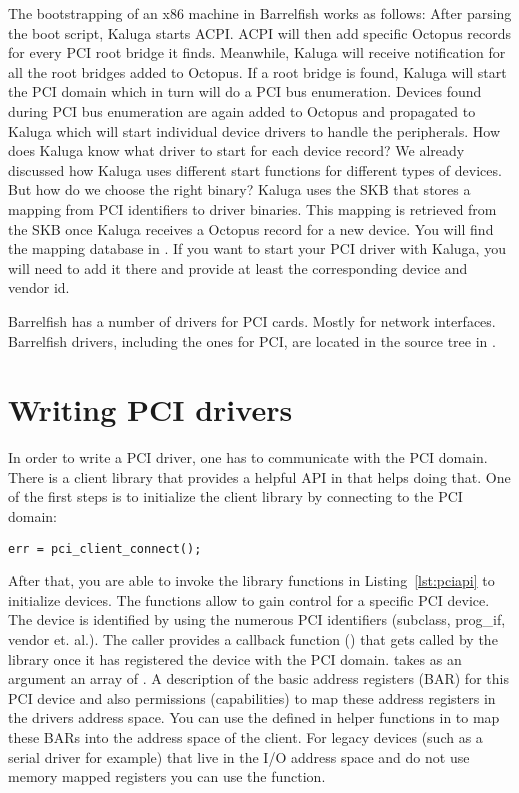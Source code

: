\documentclass[a4paper,11pt,twoside]{report}
\begin{document}
The bootstrapping of an x86 machine in Barrelfish works as follows: After
parsing the boot script, Kaluga starts ACPI. ACPI will then add specific
Octopus records for every PCI root bridge it finds. Meanwhile, Kaluga will
receive notification for all the root bridges added to Octopus. If a root
bridge is found, Kaluga will start the PCI domain which in turn will do a PCI
bus enumeration. Devices found during PCI bus enumeration are again added to
Octopus and propagated to Kaluga which will start individual device drivers to
handle the peripherals. How does Kaluga know what driver to start for each
device record? We already discussed how Kaluga uses different start functions
for different types of devices. But how do we choose the right binary? Kaluga
uses the SKB that stores a mapping from PCI identifiers to driver binaries. This
mapping is retrieved from the SKB once Kaluga receives a Octopus record for a
new device. You will find the mapping database in
. If you want to start your PCI driver
with Kaluga, you will need to add it there and provide at least the
corresponding device and vendor id.

Barrelfish has a number of drivers for PCI cards. Mostly for network
interfaces. Barrelfish drivers, including the ones for PCI, are located in the
source tree in .

\section{Writing PCI drivers}
\label{sec:pcidriverwriting}

In order to write a PCI driver, one has to communicate with the PCI domain.
There is a client library that provides a helpful API in  that
helps doing that. One of the first steps is to initialize the client library
by connecting to the PCI domain:

\begin{lstlisting}[caption={A client connects to the PCI subsystem.}, label={lst:pciconenct}]
err = pci_client_connect();
\end{lstlisting}

After that, you are able to invoke the library functions in
Listing~\ref{lst:pciapi} to initialize devices. The functions allow to gain
control for a specific PCI device. The device is identified by using the
numerous PCI identifiers (subclass, prog\_if, vendor et. al.). The caller
provides a callback function () that gets called by the
library once it has registered the device with the PCI domain.
 takes as an argument an array of . A description of the basic address registers (BAR) for this PCI
device and also permissions (capabilities) to map these address registers in
the drivers address space. You can use the defined in helper functions in
 to map these BARs into the address space of the
client. For legacy devices (such as a serial driver for example) that live in
the I/O address space and do not use memory mapped registers you can use the
 function.
\end{document}

